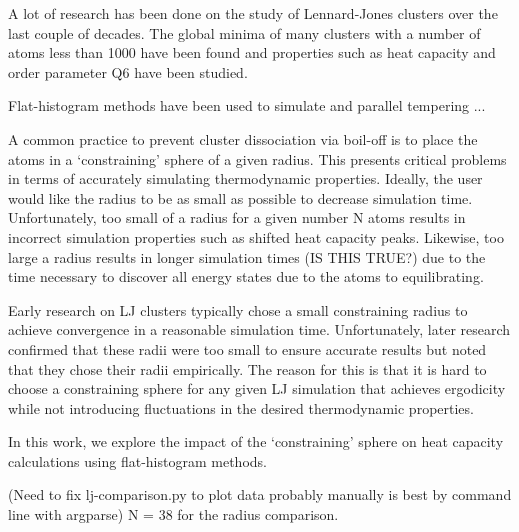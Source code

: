 \documentclass[letterpaper,twocolumn,amsmath,amssymb,pre,aps,10pt]{revtex4-1}
\begin{document}
A lot of research has been done on the study of Lennard-Jones clusters over the last couple
of decades. The global minima of many clusters with a number of atoms less than 1000 have been
found and properties such as heat capacity and order parameter Q6 have been studied.

Flat-histogram methods have been used to simulate and parallel tempering ...

A common practice to prevent cluster dissociation via boil-off is to place the atoms in a `constraining'
sphere of a given radius. This presents critical problems in terms of accurately simulating thermodynamic
properties. Ideally, the user would like the radius to be as small as possible to decrease simulation time.
Unfortunately, too small of a radius for a given number N atoms results in incorrect simulation properties
such as shifted heat capacity peaks. Likewise, too large a radius results in longer simulation times (IS THIS TRUE?)
due to the time necessary to discover all energy states due to the atoms to equilibrating.

Early research on LJ clusters typically chose a small constraining radius to achieve convergence in
a reasonable simulation time. Unfortunately, later research confirmed that these radii were too small
to ensure accurate results but noted that they chose their radii empirically. The reason for this is that
it is hard to choose a constraining sphere for any given LJ simulation that achieves ergodicity while not
introducing fluctuations in the desired thermodynamic properties.

In this work, we explore the impact of the `constraining' sphere on heat capacity calculations using flat-histogram
methods.

(Need to fix lj-comparison.py to plot data probably manually is best by command line with argparse)
N = 38 for the radius comparison.

\end{document}

